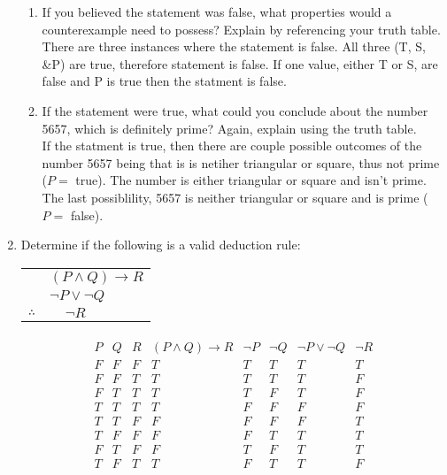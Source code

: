 \documentclass[11pt,a4paper]{article}
\newcommand\setItemNumber[1]{\setcounter{enumi}{\numexpr#1-1\relax}}
\begin{document}
\begin{enumerate}
\begin{enumerate}
                \item If you believed the statement was false, what properties would a counterexample need to possess? Explain by referencing your truth table.\\
                    There are three instances where the statement is false. All three (T, S, \&P) are true, therefore statement is false.  If one value, either T or S, are false and P is true then the statment is false. 
                \item If the statement were true, what could you conclude about the number 5657, which is definitely prime? Again, explain using the truth table.\\
                    If the statment is true, then there are couple possible outcomes of the number 5657 being that is is netiher triangular or square, thus not prime ($P =$ true). The number is either triangular or square and isn't prime. The last possiblility, 5657 is neither triangular or square and is prime ($P =$ false).
            \end{enumerate}

        \setItemNumber{14}
        \item Determine if the following is a valid deduction rule:
        \begin{center}
        \begin{tabular}{c@{\,}l@{}} 
                                & $(P\land Q)\rightarrow R$\\
                                & \;\;$\neg P\lor\neg Q$ \\\cline{1-2}
            $\therefore$        & $\;\;\;\;\neg R$ \\
          \end{tabular}
        \end{center}

                \begin{align*}
                    \begin{array}{|c|c|c|c|c|c|c|c|}
                        P & Q & R & (P\land Q)\rightarrow R & \neg P & \neg Q & \neg P \lor \neg Q & \neg R\\
                    \hline
                        F & F & F & T & T & T & T & T\\
                        F & F & T & T & T & T & T & F\\
                        F & T & T & T & T & F & T & F\\
                        T & T & T & T & F & F & F & F\\
                        T & T & F & F & F & F & F & T\\
                        T & F & F & F & F & T & T & T\\
                        F & T & F & F & T & F & T & T\\
                        T & F & T & T & F & T & T & F\\
                    \end{array}
                \end{align*}

    \end{enumerate}
	
\end{document}
